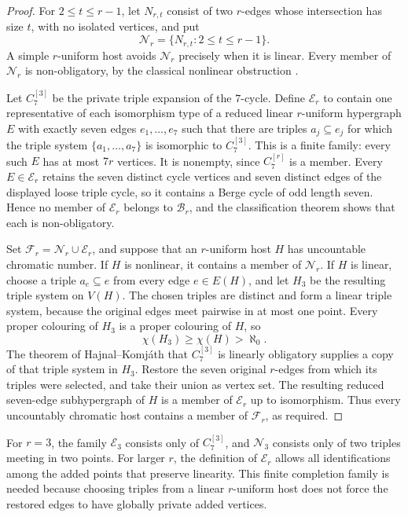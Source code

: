 \documentclass[a4paper,11pt,reqno]{amsart}
\theoremstyle{plain}
\theoremstyle{definition}
\theoremstyle{remark}
\begin{document}
\begin{proof}
For $2\le t\le r-1$, let $N_{r,t}$ consist of two $r$-edges whose
intersection has size $t$, with no isolated vertices, and put
\[
 \mathcal N_r=\{N_{r,t}:2\le t\le r-1\}.
\]
A simple $r$-uniform host avoids $\mathcal N_r$ precisely when it is
linear.  Every member of $\mathcal N_r$ is non-obligatory, by the
classical nonlinear obstruction \citep{ehr1973}.

Let $C_7^{[3]}$ be the private triple expansion of the $7$-cycle.
Define $\mathcal E_r$ to contain one representative of each isomorphism
type of a reduced linear $r$-uniform hypergraph $E$ with exactly seven
edges $e_1,\ldots,e_7$ such that there are triples
$a_j\subseteq e_j$ for which the triple system
$\{a_1,\ldots,a_7\}$ is isomorphic to $C_7^{[3]}$.
This is a finite family: every such $E$ has at most $7r$ vertices.
It is nonempty, since $C_7^{[r]}$ is a member.
Every $E\in\mathcal E_r$ retains the seven distinct cycle vertices
and seven distinct edges of the displayed loose triple cycle, so it
contains a Berge cycle of odd length seven.  Hence no member of
$\mathcal E_r$ belongs to $\mathcal B_r$, and the classification
theorem shows that each is non-obligatory.

Set $\mathcal F_r=\mathcal N_r\cup\mathcal E_r$, and suppose that
an $r$-uniform host $H$ has uncountable chromatic number.
If $H$ is nonlinear, it contains a member of $\mathcal N_r$.
If $H$ is linear, choose a triple $a_e\subseteq e$ from every edge
$e\in E(H)$, and let $H_3$ be the resulting triple system on $V(H)$.
The chosen triples are distinct and form a linear triple system,
because the original edges meet pairwise in at most one point.
Every proper colouring of $H_3$ is a proper colouring of $H$, so
\[
 \chi(H_3)\ge\chi(H)>\aleph_0.
\]
The theorem of Hajnal--Komj\'ath that $C_7^{[3]}$ is linearly
obligatory \citep{hajnalkomjath2008} supplies a copy of that triple
system in $H_3$.  Restore the seven original $r$-edges from which
its triples were selected, and take their union as vertex set.
The resulting reduced seven-edge subhypergraph of $H$ is a member
of $\mathcal E_r$ up to isomorphism.  Thus every uncountably
chromatic host contains a member of $\mathcal F_r$, as required.
\end{proof}

For $r=3$, the family $\mathcal E_3$ consists only of
$C_7^{[3]}$, and $\mathcal N_3$ consists only of two triples meeting
in two points.  For larger $r$, the definition of $\mathcal E_r$
allows all identifications among the added points that preserve
linearity.  This finite completion family is needed because choosing
triples from a linear $r$-uniform host does not force the restored
edges to have globally private added vertices.
\end{document}
